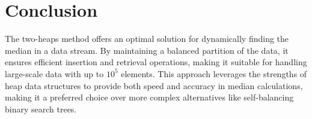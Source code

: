 \section*{Conclusion}

The two-heaps method offers an optimal solution for dynamically finding the median in a data stream. By maintaining a balanced partition of the data, it ensures efficient insertion and retrieval operations, making it suitable for handling large-scale data with up to \(10^5\) elements. This approach leverages the strengths of heap data structures to provide both speed and accuracy in median calculations, making it a preferred choice over more complex alternatives like self-balancing binary search trees.

\printindex

